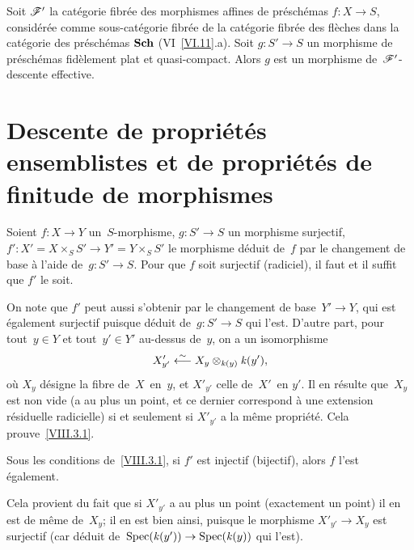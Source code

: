 \begin{theoreme}
\label{VIII.2.1}
Soit $\cal{F}'$ la cat\'egorie fibr\'ee des morphismes affines de
pr\'esch\'emas $f\colon X\to S$, consid\'er\'ee comme
sous-cat\'egorie fibr\'ee de la cat\'egorie fibr\'ee
des fl\`eches dans la cat\'egorie des pr\'esch\'emas $\mathbf{Sch}$
\textup{(VI~\ref{VI.11}.a)}. Soit $g\colon S'\to S$ un morphisme de
pr\'esch\'emas fid\`element plat et quasi-compact. Alors $g$ est
un morphisme de~$\cal{F}'$-descente effective.
\end{theoreme}

\section[Descente de propri\'et\'es ensemblistes]{Descente de propri\'et\'es ensemblistes et de propri\'et\'es de finitude de morphismes\footnotemark}
\label{VIII.3}



\begin{proposition}
\label{VIII.3.1}
Soient $f\colon X\to Y$ un~$S$-morphisme, $g\colon S'\to S$ un
morphisme surjectif, $f'\colon X'=X\times_{S}S'\to Y'=Y\times_{S}S'$
le morphisme d\'eduit de~$f$ par le changement de base \`a l'aide
de~$g\colon S'\to S$. Pour que $f$ soit surjectif (\resp radiciel), il
faut et il suffit que $f'$ le soit.
\end{proposition}

On note que $f'$ peut aussi s'obtenir par le changement de base~$Y'\to
Y$, qui est \'egalement surjectif puisque d\'eduit de~$g\colon
S'\to S$ qui l'est. D'autre part, pour tout~$y\in Y$ et tout~$y'\in Y'$
au-dessus de~$y$, on a un isomorphisme
$$
X'_{y'}\overset{\sim}{\longleftarrow} X_{y}\otimes_{\mathit{k}(y)}\mathit{k}(y'),
$$
o\`u $X_{y}$ d\'esigne la fibre de~$X$~en~$y$, et $X'_{y'}$ celle
de~$X'$~en $y'$. Il en r\'esulte que~$X_{y}$ est non vide (\resp a
au plus un point, et ce dernier correspond \`a une extension
r\'esiduelle radicielle) si et seulement si
$X'_{y'}$
a la m\^eme propri\'et\'e. Cela prouve~\ref{VIII.3.1}.

\begin{corollaire}
\label{VIII.3.2}
Sous les conditions de~\ref{VIII.3.1}, si $f'$ est injectif
(\resp bijectif), alors $f$ l'est \'egalement.
\end{corollaire}

Cela provient du fait que si $X'_{y'}$ a au plus un point
(\resp exactement un point) il en est de m\^eme de~$X_{y}$; il en
est bien ainsi, puisque le morphisme $X'_{y'}\to X_{y}$ est surjectif
(car d\'eduit de~$\Spec(\kres(y'))\to \Spec(\kres(y))$ qui l'est).

